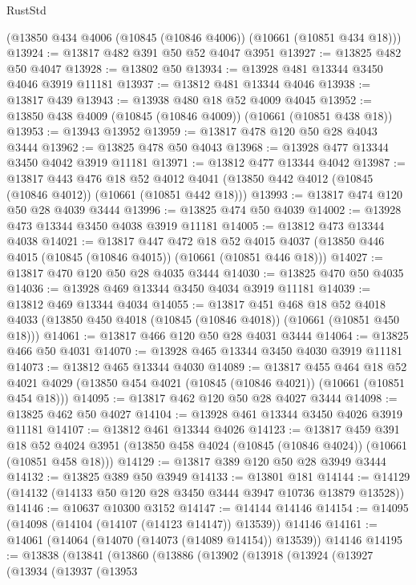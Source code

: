 \begin{lexlean}{RustStd}
\begin{coremodule}
    (@13850 @434 @4006 (@10845 (@10846 @4006)) (@10661 (@10851 @434 @18)))
@13924 := @13817 @482 @391 @50 @52 @4047 @3951
@13927 := @13825 @482 @50 @4047
@13928 := @13802 @50
@13934 := @13928 @481 @13344 @3450 @4046 @3919 @11181
@13937 := @13812 @481 @13344 @4046
@13938 := @13817 @439
@13943 := @13938 @480 @18 @52 @4009 @4045
@13952 := @13850 @438 @4009 (@10845 (@10846 @4009)) (@10661 (@10851 @438 @18))
@13953 := @13943 @13952
@13959 := @13817 @478 @120 @50 @28 @4043 @3444
@13962 := @13825 @478 @50 @4043
@13968 := @13928 @477 @13344 @3450 @4042 @3919 @11181
@13971 := @13812 @477 @13344 @4042
@13987 := @13817
    @443
    @476
    @18
    @52
    @4012
    @4041
    (@13850 @442 @4012 (@10845 (@10846 @4012)) (@10661 (@10851 @442 @18)))
@13993 := @13817 @474 @120 @50 @28 @4039 @3444
@13996 := @13825 @474 @50 @4039
@14002 := @13928 @473 @13344 @3450 @4038 @3919 @11181
@14005 := @13812 @473 @13344 @4038
@14021 := @13817
    @447
    @472
    @18
    @52
    @4015
    @4037
    (@13850 @446 @4015 (@10845 (@10846 @4015)) (@10661 (@10851 @446 @18)))
@14027 := @13817 @470 @120 @50 @28 @4035 @3444
@14030 := @13825 @470 @50 @4035
@14036 := @13928 @469 @13344 @3450 @4034 @3919 @11181
@14039 := @13812 @469 @13344 @4034
@14055 := @13817
    @451
    @468
    @18
    @52
    @4018
    @4033
    (@13850 @450 @4018 (@10845 (@10846 @4018)) (@10661 (@10851 @450 @18)))
@14061 := @13817 @466 @120 @50 @28 @4031 @3444
@14064 := @13825 @466 @50 @4031
@14070 := @13928 @465 @13344 @3450 @4030 @3919 @11181
@14073 := @13812 @465 @13344 @4030
@14089 := @13817
    @455
    @464
    @18
    @52
    @4021
    @4029
    (@13850 @454 @4021 (@10845 (@10846 @4021)) (@10661 (@10851 @454 @18)))
@14095 := @13817 @462 @120 @50 @28 @4027 @3444
@14098 := @13825 @462 @50 @4027
@14104 := @13928 @461 @13344 @3450 @4026 @3919 @11181
@14107 := @13812 @461 @13344 @4026
@14123 := @13817
    @459
    @391
    @18
    @52
    @4024
    @3951
    (@13850 @458 @4024 (@10845 (@10846 @4024)) (@10661 (@10851 @458 @18)))
@14129 := @13817 @389 @120 @50 @28 @3949 @3444
@14132 := @13825 @389 @50 @3949
@14133 := @13801 @181
@14144 := @14129 (@14132 (@14133 @50 @120 @28 @3450 @3444 @3947 @10736 @13879 @13528))
@14146 := @10637 @10300 @3152
@14147 := @14144 @14146
@14154 := @14095 (@14098 (@14104 (@14107 (@14123 @14147)) @13539)) @14146
@14161 := @14061 (@14064 (@14070 (@14073 (@14089 @14154)) @13539)) @14146
@14195 := @13838
    (@13841
      (@13860
        (@13886
          (@13902
            (@13918
              (@13924
                (@13927
                  (@13934
                    (@13937
                      (@13953

\end{coremodule}
\end{lexlean}
